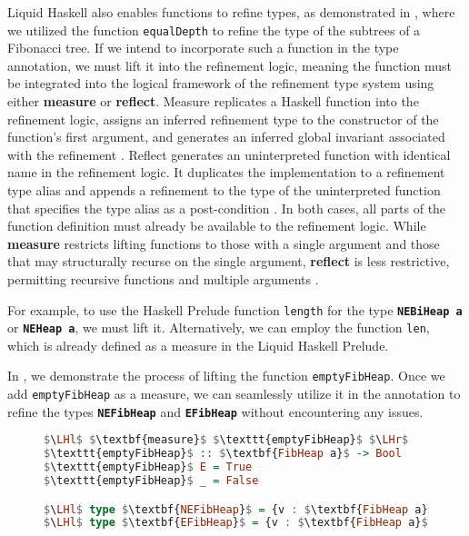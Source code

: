\documentclass{clmthesis}
\begin{document}
Liquid Haskell also enables functions to refine types, as demonstrated in , where we utilized the function \texttt{equalDepth} to refine the type of the subtrees of a Fibonacci tree. If we intend to incorporate such a function in the type annotation, we must lift it into the refinement logic, meaning the function must be integrated into the logical framework of the refinement type system using either \textbf{measure} or \textbf{reflect}.
Measure replicates a Haskell function into the refinement logic, assigns an inferred refinement type to the constructor of the function's first argument, and generates an inferred global invariant associated with the refinement \cite{vazou2014liquidhaskell}.
Reflect generates an uninterpreted function with identical name in the refinement logic. It duplicates the implementation to a refinement type alias and appends a refinement to the type of the uninterpreted function that specifies the type alias as a post-condition \cite{vazou2017refinement}.
In both cases, all parts of the function definition must already be available to the refinement logic. While \textbf{measure} restricts lifting functions to those with a single argument and those that may structurally recurse on the single argument, \textbf{reflect} is less restrictive, permitting recursive functions and multiple arguments \cite{vazou2014liquidhaskell}. %

For example, to use the Haskell Prelude function \texttt{length} for the type \textbf{\lstinline{NEBiHeap a}} or \textbf{\lstinline{NEHeap a}}, we must lift it. Alternatively, we can employ the function \texttt{len}, which is already defined as a measure in the Liquid Haskell Prelude.

In , we demonstrate the process of lifting the function \texttt{emptyFibHeap}. Once we add \texttt{emptyFibHeap} as a measure, we can seamlessly utilize it in the annotation to refine the types \textbf{\lstinline{NEFibHeap}} and \textbf{\lstinline{EFibHeap}} without encountering any issues.
\begin{figure}[h]
\begin{lstlisting}[mathescape=true, language=haskell, caption={Measure \texttt{emptyFibHeap}.},captionpos=b, label=fig:measure]
$\LHl$ $\textbf{measure}$ $\texttt{emptyFibHeap}$ $\LHr$
$\texttt{emptyFibHeap}$ :: $\textbf{FibHeap a}$ -> Bool
$\texttt{emptyFibHeap}$ E = True
$\texttt{emptyFibHeap}$ _ = False

$\LHl$ type $\textbf{NEFibHeap}$ = {v : $\textbf{FibHeap a}$ | not $\texttt{emptyFibHeap}$ v} $\LHr$
$\LHl$ type $\textbf{EFibHeap}$ = {v : $\textbf{FibHeap a}$ | ($\texttt{emptyFibHeap}$ v)} $\LHr$
\end{lstlisting}
\end{figure}
\end{document}

